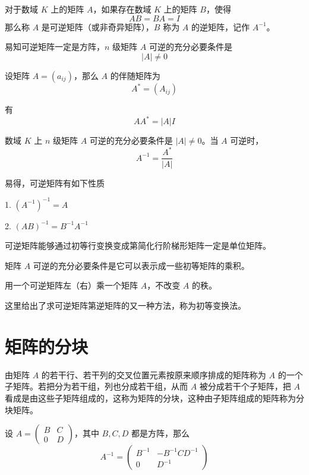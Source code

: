 \begin{definition}
    对于数域 $K$ 上的矩阵 $A$，如果存在数域 $K$ 上的矩阵 $B$，使得
    $$AB = BA = I$$
    那么称 $A$ 是可逆矩阵（或非奇异矩阵），$B$ 称为 $A$ 的逆矩阵，记作 $A^{-1}$。
\end{definition}

易知可逆矩阵一定是方阵，$n$ 级矩阵 $A$ 可逆的充分必要条件是
$$|A| \ne 0$$

\begin{definition}
    设矩阵 $A = (a_{ij})$，那么 $A$ 的伴随矩阵为
    $$A^*=(A_{ij})$$
\end{definition}

有
$$AA^* = |A|I$$

\begin{theorem}
    数域 $K$ 上 $n$ 级矩阵 $A$ 可逆的充分必要条件是 $|A| \ne 0$。当 $A$ 可逆时，
    $$A^{-1} = \frac{A^*}{|A|}$$
\end{theorem}

易得，可逆矩阵有如下性质

1. $(A^{-1})^{-1} = A$

2. $(AB)^{-1} = B^{-1}A^{-1}$

可逆矩阵能够通过初等行变换变成第简化行阶梯形矩阵一定是单位矩阵。

\begin{theorem}
    矩阵 $A$ 可逆的充分必要条件是它可以表示成一些初等矩阵的乘积。
\end{theorem}

用一个可逆矩阵左（右）乘一个矩阵 $A$，不改变 $A$ 的秩。

这里给出了求可逆矩阵第逆矩阵的又一种方法，称为初等变换法。

\section{矩阵的分块}

由矩阵 $A$ 的若干行、若干列的交叉位置元素按原来顺序排成的矩阵称为 $A$ 的一个子矩阵。若把分为若干组，列也分成若干组，从而 $A$ 被分成若干个子矩阵，把 $A$ 看成是由这些子矩阵组成的，这称为矩阵的分块，这种由子矩阵组成的矩阵称为分块矩阵。

\begin{theorem}
    设 $A = \left(\begin{matrix} B & C\\ 0 & D \end{matrix}\right)$，其中 $B,C,D$ 都是方阵，那么
    $$A^{-1} = \left(\begin{matrix} B^{-1} & -B^{-1}CD^{-1}\\ 0 & D^{-1} \end{matrix}\right)$$
\end{theorem}

